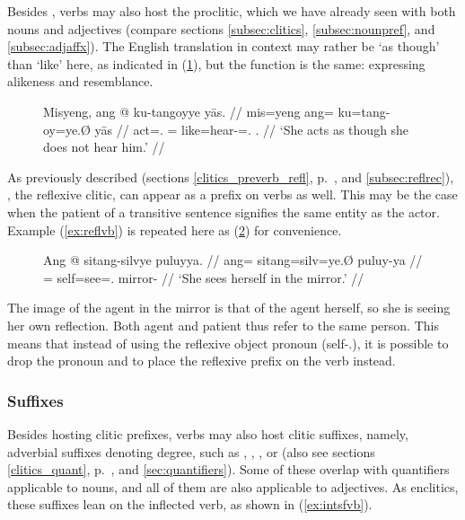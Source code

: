 Besides , verbs may also host the 
proclitic, which we have already seen with both nouns and adjectives (compare
sections \ref{subsec:clitics}, \ref{subsec:nounpref}, and
\ref{subsec:adjaffx}). The English translation in context may rather be `as
though' than `like' here, as indicated in (\ref{ex:likecompl}), but the
function is the same: expressing alikeness and resemblance.

\begin{figure}[h]
\ex\label{ex:likecompl}\begingl
	\gla Misyeng, ang @ ku-tangoyye yās. //
	\glb mis=yeng ang= ku=tang-oy=ye.Ø yās //
	\glc act=\TsgF{}.\Aarg{} \AgtT{}= like=hear-\Neg{}=\TsgF{}.\Top{} 
		\TsgM{}.\Parg{} //
	\glft `She acts as though she does not hear him.' //
\endgl\xe
\end{figure}

As previously described (sections \ref{clitics_preverb_refl},
p.~\pageref{clitics_preverb_refl}, and \ref{subsec:reflrec}),
, the reflexive clitic, can appear as a prefix on
verbs as well. This may be the case when the patient of a transitive sentence
signifies the same entity as the actor. Example (\ref{ex:reflvb}) is repeated
here as (\ref{ex:reflvb_2}) for convenience.

\begin{figure}[h]
\ex\label{ex:reflvb_2}\begingl
	\gla Ang @ sitang-silvye puluyya. //
	\glb ang= sitang=silv=ye.Ø puluy-ya //
	\glc \AgtT{}= self=see=\TsgF{}.\Top{} mirror-\Loc{} //
	\glft `She sees herself in the mirror.' //
\endgl\xe
\end{figure}

The image of the agent in the mirror is that of the agent herself, so she is
seeing her own reflection. Both agent and patient thus refer to the same
person. This means that instead of using the reflexive object pronoun
 (self-\TsgF{}.\Parg{}), it is possible
to drop the pronoun and to place the reflexive prefix on the verb instead.

\subsubsection{Suffixes}

Besides hosting clitic prefixes, verbs may also host clitic suffixes, namely,
adverbial suffixes denoting degree, such as
,
,
, or
(also see sections \ref{clitics_quant}, p.~\pageref{clitics_quant}, and
\ref{sec:quantifiers}). Some of these overlap with quantifiers
applicable to nouns, and all of them are also applicable to adjectives. As
enclitics, these suffixes lean on the inflected verb, as shown in 
(\ref{ex:intsfvb}).

